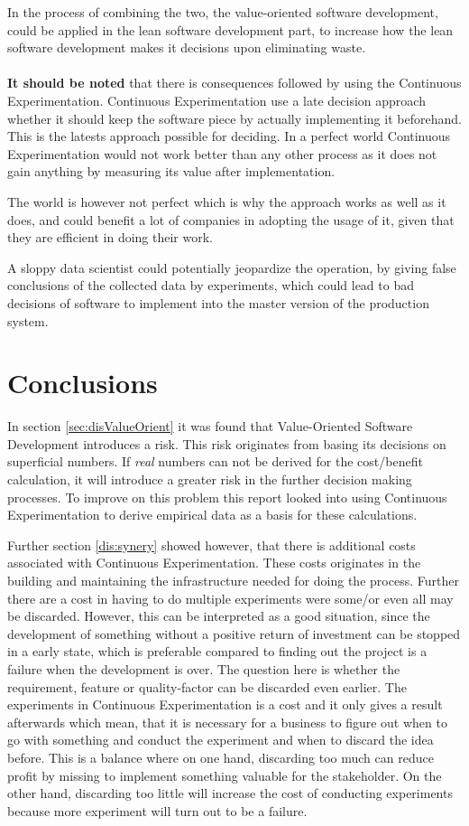 \documentclass{sig-alternate}
\begin{document}
In the process of combining the two, the value-oriented software development, could be applied in the lean
software development part, to increase how the lean software development makes it decisions upon eliminating 
waste.
\\
\\
\textbf{It should be noted} that there is consequences followed by using the Continuous Experimentation. 
Continuous Experimentation use a late decision approach whether it should keep the software piece by 
actually implementing it beforehand. 
This is the latests approach possible for deciding. In a perfect world Continuous Experimentation would not
work better than any other process as it does not gain anything by measuring its value after implementation.

The world is however not perfect which is why the approach works as well as it does, and could benefit 
a lot of companies in adopting the usage of it, given that they are efficient in doing their work. 

A sloppy data scientist could potentially jeopardize the operation, by giving false conclusions of the 
collected data by experiments, which could lead to bad decisions of software to implement into the master
version of the production system.

\section{Conclusions}


In section \ref{sec:disValueOrient} it was found that Value-Oriented Software Development introduces a risk. This risk originates from basing its decisions on superficial numbers. If \textit{real} numbers can not be derived for the cost/benefit calculation, it will introduce a greater risk in the further decision making processes. To improve on this problem this report looked into using Continuous Experimentation to derive empirical data as a basis for these calculations. 


Further section \ref{dis:synery} showed however, that there is additional costs associated with Continuous Experimentation. These costs originates in the building and maintaining the infrastructure needed for doing the process. Further there are a cost in having to do multiple experiments were some/or even all may be discarded. However, this can be interpreted as a good situation, since the development of something without a positive return of investment can be stopped in a early state, which is preferable compared to finding out the project is a failure when the development is over. The question here is whether the requirement, feature or quality-factor can be discarded even earlier. The experiments in Continuous Experimentation is a cost and it only gives a result afterwards which mean, that it is necessary for a business to figure out when to go with something and conduct the experiment and when to discard the idea before. This is a balance where on one hand, discarding too much can reduce profit by missing to implement something valuable for the stakeholder. On the other hand, discarding too little will increase the cost of conducting experiments because more experiment will turn out to be a failure. 
\end{document}
